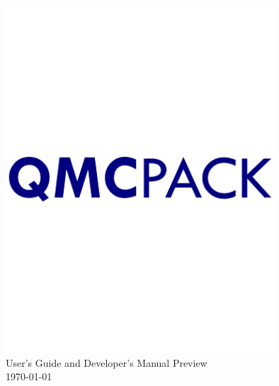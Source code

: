 
  \begin{center}
\includegraphics[width=10cm]{figures/QMCPACK_logo.pdf}\\
{\huge User's Guide and Developer's Manual Preview\\}
{
\huge %
\today}

  \end{center}
